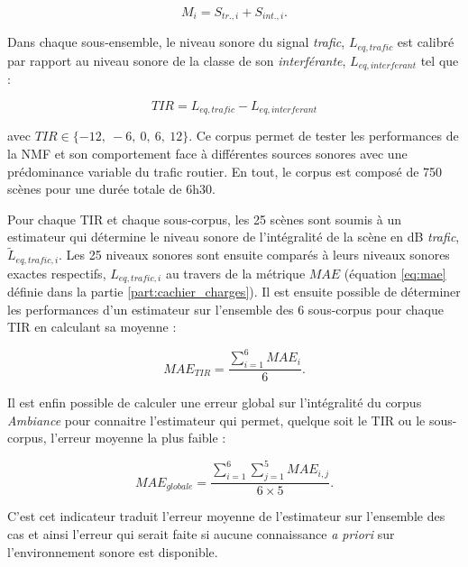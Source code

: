 \begin{equation}
M_i = S_{tr.,i}+S_{int.,i}.
\end{equation}

Dans chaque sous-ensemble, le niveau sonore du signal \textit{trafic}, $L_{eq,trafic}$ est calibré par rapport au niveau sonore de la classe de son \textit{interférante}, $L_{eq,interferant}$ tel que : 

\begin{equation}
TIR = L_{eq,trafic} - L_{eq,interferant}
\end{equation}

avec $TIR \in \lbrace -12,~-6,~0,~6,~12 \rbrace$. Ce corpus permet de tester les performances de la NMF et son comportement face à différentes sources sonores avec une prédominance variable du trafic routier. En tout, le corpus est composé de 750 scènes pour une durée totale de 6h30.

Pour chaque TIR et chaque sous-corpus, les 25 scènes sont soumis à un estimateur qui détermine le niveau sonore de l'intégralité de la scène en dB \textit{trafic},  $\tilde{L}_{eq,trafic, i}$. Les 25 niveaux sonores sont ensuite comparés à leurs niveaux sonores exactes respectifs, $L_{eq,trafic, i}$ au travers de la métrique $MAE$ (équation \ref{eq:mae} définie dans la partie \ref{part:cachier_charges}). Il est ensuite possible de déterminer les performances d'un estimateur sur l'ensemble des 6 sous-corpus pour chaque TIR en calculant sa moyenne :

\begin{equation}
MAE_{TIR} = \frac{\sum_{i = 1}^6 MAE_{i}}{6}.
\end{equation}

Il est enfin possible de calculer une erreur global sur l'intégralité du corpus \textit{Ambiance} pour connaitre l'estimateur qui permet, quelque soit le TIR ou le sous-corpus, l'erreur moyenne la plus faible : 

\begin{equation}
MAE_{globale} = \frac{\sum_{i = 1}^6 \sum_{j = 1}^5 MAE_{i,j}}{6 \times 5}.
\end{equation}

C'est cet indicateur traduit l'erreur moyenne de l'estimateur sur l'ensemble des cas et ainsi l'erreur qui serait faite si aucune connaissance \textit{a priori} sur l'environnement sonore est disponible.

